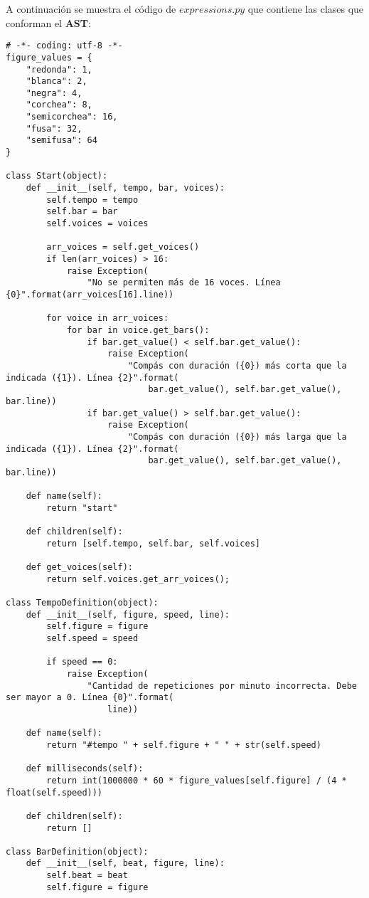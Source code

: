 A continuación se muestra el código de $expressions.py$ que contiene las clases que conforman el \textbf{AST}:

\begin{verbatim}
# -*- coding: utf-8 -*-
figure_values = {
    "redonda": 1,
    "blanca": 2,
    "negra": 4,
    "corchea": 8,
    "semicorchea": 16,
    "fusa": 32,
    "semifusa": 64
}

class Start(object):
    def __init__(self, tempo, bar, voices):
        self.tempo = tempo
        self.bar = bar
        self.voices = voices

        arr_voices = self.get_voices()
        if len(arr_voices) > 16:
            raise Exception(
                "No se permiten más de 16 voces. Línea {0}".format(arr_voices[16].line))

        for voice in arr_voices:
            for bar in voice.get_bars():
                if bar.get_value() < self.bar.get_value():
                    raise Exception(
                        "Compás con duración ({0}) más corta que la indicada ({1}). Línea {2}".format(
                            bar.get_value(), self.bar.get_value(), bar.line))
                if bar.get_value() > self.bar.get_value():
                    raise Exception(
                        "Compás con duración ({0}) más larga que la indicada ({1}). Línea {2}".format(
                            bar.get_value(), self.bar.get_value(), bar.line))

    def name(self):
        return "start"

    def children(self):
        return [self.tempo, self.bar, self.voices]

    def get_voices(self):
        return self.voices.get_arr_voices();

class TempoDefinition(object):
    def __init__(self, figure, speed, line):
        self.figure = figure
        self.speed = speed

        if speed == 0:
            raise Exception(
                "Cantidad de repeticiones por minuto incorrecta. Debe ser mayor a 0. Línea {0}".format(
                    line))

    def name(self):
        return "#tempo " + self.figure + " " + str(self.speed)

    def milliseconds(self):
        return int(1000000 * 60 * figure_values[self.figure] / (4 * float(self.speed)))

    def children(self):
        return []

class BarDefinition(object):
    def __init__(self, beat, figure, line):
        self.beat = beat
        self.figure = figure


\end{verbatim}
